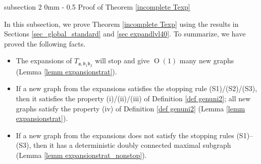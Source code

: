 \documentclass{article}
\makeatletter
\newcommand{\1}{\mathds{1}}
\numberwithin{equation}{section}
\newcommand{\fa}{{\mathfrak a}}
\newcommand{\fb}{{\mathfrak b}}
\DeclareMathOperator{\OO}{O}
\theoremstyle{plain} %
\theoremstyle{remark}
\renewcommand{\subsection}{\@startsection
	{subsection}%
	{2}%
	{0mm}%
	{-\baselineskip}%
	{0.5\baselineskip}%
	{\normalfont\bf\itshape}} %
\makeatother
\begin{document}
\subsection{Proof of Theorem \ref{incomplete Texp}}\label{sec expandlvl4}

In this subsection, we prove Theorem \ref{incomplete Texp} using the results in Sections \ref{sec_global_standard} and \ref{sec expandlvl40}. To summarize, we have proved the following facts.
\begin{itemize}
\item[(I)] The expansions of $T_{\fa,\fb_1\fb_2}$ will stop and give $\OO(1)$ many new graphs (Lemma \ref{lemm expansionstrat}). 


\item[(II)] If a new graph from the expansions satisfies the stopping rule (S1)/(S2)/(S3), then it satisfies the property (i)/(ii)/(iii) of Definition \ref{def genuni2}; all new graphs satisfy the property (iv) of Definition \ref{def genuni2} (Lemma \ref{lemm expansionstrat}).

\item[(III)] If a new graph from the expansions does not satisfy the stopping rules (S1)--(S3), then it has a deterministic doubly connected maximal subgraph (Lemma \ref{lemm expansionstrat_nonstop}).
\end{itemize}
\end{document}
